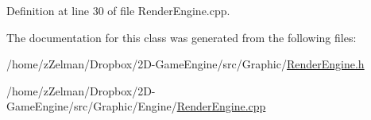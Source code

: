 Definition at line 30 of file Render\-Engine.\-cpp.



The documentation for this class was generated from the following files\-:\begin{DoxyCompactItemize}
\item 
/home/z\-Zelman/\-Dropbox/2\-D-\/\-Game\-Engine/src/\-Graphic/\hyperlink{RenderEngine_8h}{Render\-Engine.\-h}\item 
/home/z\-Zelman/\-Dropbox/2\-D-\/\-Game\-Engine/src/\-Graphic/\-Engine/\hyperlink{RenderEngine_8cpp}{Render\-Engine.\-cpp}\end{DoxyCompactItemize}
